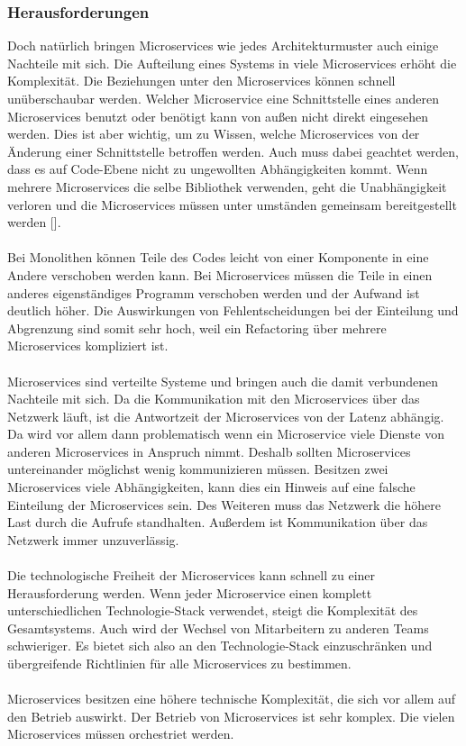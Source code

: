 \subsubsection{Herausforderungen}

Doch natürlich bringen Microservices wie jedes Architekturmuster auch einige Nachteile mit sich. Die Aufteilung eines Systems in viele Microservices erhöht die Komplexität. Die Beziehungen unter den Microservices können schnell unüberschaubar werden. Welcher Microservice eine Schnittstelle eines anderen Microservices benutzt oder benötigt kann von außen nicht direkt eingesehen werden. Dies ist aber wichtig, um zu Wissen, welche Microservices von der Änderung einer Schnittstelle betroffen werden. Auch muss dabei geachtet werden, dass es auf Code-Ebene nicht zu ungewollten Abhängigkeiten kommt. Wenn mehrere Microservices die selbe Bibliothek verwenden, geht die Unabhängigkeit verloren und die Microservices müssen unter umständen gemeinsam bereitgestellt werden [\cite[S. 75]{wolffMicroservices2018}]. \\
\\
Bei Monolithen können Teile des Codes leicht von einer Komponente in eine Andere verschoben werden kann. Bei Microservices müssen die Teile in einen anderes eigenständiges Programm verschoben werden und der Aufwand ist deutlich höher. Die Auswirkungen von Fehlentscheidungen bei der Einteilung und Abgrenzung sind somit sehr hoch, weil ein Refactoring über mehrere Microservices kompliziert ist. \\
\\
Microservices sind verteilte Systeme und bringen auch die damit verbundenen Nachteile mit sich. Da die Kommunikation mit den Microservices über das Netzwerk läuft, ist die Antwortzeit der Microservices von der Latenz abhängig. Da wird vor allem dann problematisch wenn ein Microservice viele Dienste von anderen Microservices in Anspruch nimmt. Deshalb sollten Microservices untereinander möglichst wenig kommunizieren müssen. Besitzen zwei Microservices viele Abhängigkeiten, kann dies ein Hinweis auf eine falsche Einteilung der Microservices sein. Des Weiteren muss das Netzwerk die höhere Last durch die Aufrufe standhalten. Außerdem ist Kommunikation über das Netzwerk immer unzuverlässig. \\
\\
Die technologische Freiheit der Microservices kann schnell zu einer Herausforderung werden. Wenn jeder Microservice einen komplett unterschiedlichen Technologie-Stack verwendet, steigt die Komplexität des Gesamtsystems. Auch wird der Wechsel von Mitarbeitern zu anderen Teams schwieriger. Es bietet sich also an den Technologie-Stack einzuschränken und übergreifende Richtlinien für alle Microservices zu bestimmen. \\
\\
Microservices besitzen eine höhere technische Komplexität, die sich vor allem auf den Betrieb auswirkt. Der Betrieb von Microservices ist sehr komplex. Die vielen Microservices müssen orchestriet werden.

